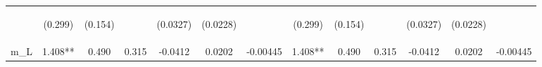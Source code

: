 \documentclass[]{article}
\begin{document}
\begin{center}
\begin{tabular}{lcccccccccccc}
\vspace{4pt} & \begin{footnotesize}(0.299)\end{footnotesize} & \begin{footnotesize}(0.154)\end{footnotesize} & \begin{footnotesize}\end{footnotesize} & \begin{footnotesize}(0.0327)\end{footnotesize} & \begin{footnotesize}(0.0228)\end{footnotesize} & \begin{footnotesize}\end{footnotesize} & \begin{footnotesize}(0.299)\end{footnotesize} & \begin{footnotesize}(0.154)\end{footnotesize} & \begin{footnotesize}\end{footnotesize} & \begin{footnotesize}(0.0327)\end{footnotesize} & \begin{footnotesize}(0.0228)\end{footnotesize} & \begin{footnotesize}\end{footnotesize} \\
m\_L & 1.408** & 0.490 & 0.315 & -0.0412 & 0.0202 & -0.00445 & 1.408** & 0.490 & 0.315 & -0.0412 & 0.0202 & -0.00445 \\

\end{tabular}
\end{center}
\end{document}
